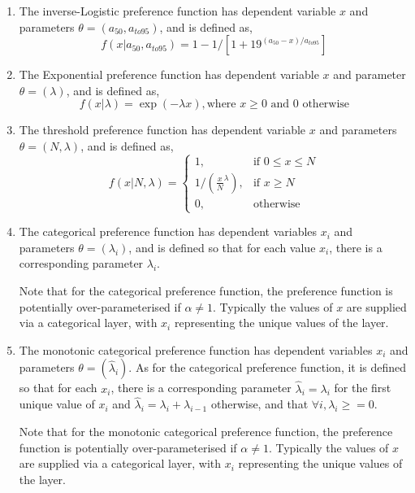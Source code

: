 \begin{enumerate}
\item The inverse-Logistic preference function has dependent variable $x$ and parameters $\theta = (a_{50},a_{to95})$, and is defined as,
\begin{equation}
  f(x | a_{50}, a_{to95}) =1- 1 / [1+19^{(a_{50}-x)/a_{to95}}]
\end{equation}

\item The Exponential preference function has dependent variable $x$ and parameter $\theta = (\lambda)$, and is defined as,
\begin{equation}
  f(x | \lambda) =\exp(-\lambda x), \text{where $x \geq 0$ and $0$ otherwise}
\end{equation}

\item The threshold preference function has dependent variable $x$ and parameters $\theta = (N,\lambda)$, and is defined as,
\begin{equation}
  f(x | N, \lambda) = \begin{cases}
    1, & \text{if $0 \le x \leq N$} \\
    1/\left({\frac{x}{N}}^\lambda\right), & \text{if $x \ge N$}\\
    0, & \text{otherwise}
  \end{cases}
\end{equation}

\item The categorical preference function has dependent variables $x_i$ and parameters $\theta = (\lambda_i)$, and is defined so that for each value $x_i$, there is a corresponding parameter $\lambda_i$. 

Note that for the categorical preference function, the preference function is potentially over-parameterised if $\alpha \ne 1$. Typically the values of $x$ are supplied via a categorical layer, with $x_i$ representing the unique values of the layer.

\item The monotonic categorical preference function has dependent variables $x_i$ and parameters $\theta = (\hat{\lambda}_i)$. As for the categorical preference function, it is defined so that for each $x_i$, there is a corresponding parameter $\hat{\lambda}_i = \lambda_i$ for the first unique value of $x_i$ and  $\hat{\lambda}_i = \lambda_i+ \lambda_{i-1}$ otherwise, and that $\forall{i}, \lambda_i \ge=0 $.

Note that for the monotonic categorical preference function, the preference function is potentially over-parameterised if $\alpha \ne 1$. Typically the values of $x$ are supplied via a categorical layer, with $x_i$ representing the unique values of the layer.

\end{enumerate}

